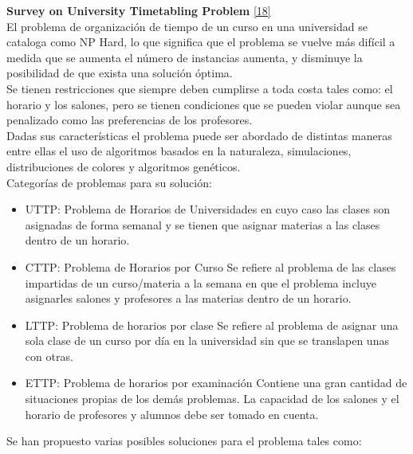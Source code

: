 \label{sec:introduccion}

\textbf{Survey on University Timetabling Problem} \ref{18} \\

El problema de organización de tiempo de un curso en una universidad se cataloga como NP Hard, lo que significa que el problema se vuelve más difícil a medida que se aumenta el número de instancias aumenta, y disminuye la posibilidad de que exista una solución óptima. \\

Se tienen restricciones que siempre deben cumplirse a toda costa tales como: el horario y los salones, pero se tienen condiciones que se pueden violar aunque sea penalizado como las preferencias de los profesores. \\ 

Dadas sus características el problema puede ser abordado de distintas maneras entre ellas el uso de algoritmos basados en la naturaleza, simulaciones, distribuciones de colores y algoritmos genéticos. \\

Categorías de problemas para su solución:
	
	\begin{itemize}
		\item UTTP: Problema de Horarios de Universidades
		en cuyo caso las clases son asignadas de forma semanal y se tienen que asignar materias a las clases dentro de un horario.
		
		\item CTTP: Problema de Horarios por Curso
		Se refiere al problema de las clases impartidas de un curso/materia a la semana en que el problema incluye asignarles salones y profesores a las materias dentro de un horario.
		
		\item LTTP: Problema de horarios por clase
		Se refiere al problema de asignar una sola clase de un curso por día en la universidad sin que se translapen unas con otras.
		
		\item ETTP: Problema de horarios por examinación
		Contiene una gran cantidad de situaciones propias de los demás problemas. La capacidad de los salones y el horario de profesores y alumnos debe ser tomado en cuenta.
	\end{itemize}
	
	Se han propuesto varias posibles soluciones para el problema tales como:
	
